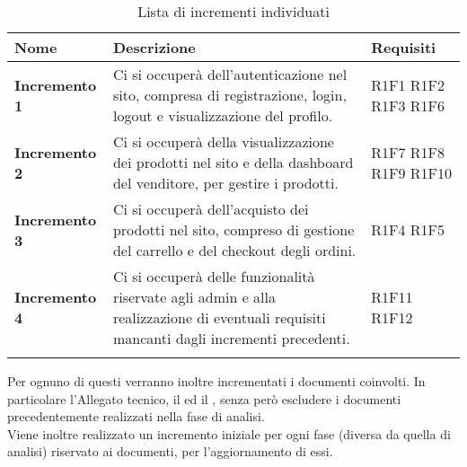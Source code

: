 {


\centering
\renewcommand{\arraystretch}{1.8}
\begin{longtable}{C{3cm} C{8cm} C{3cm} }

\textbf{Nome} &
\textbf{Descrizione}&
\textbf{Requisiti}\\
\endhead

\textbf{Incremento 1} & Ci si occuperà dell'autenticazione nel sito, compresa di registrazione, login, logout e visualizzazione del profilo. & R1F1 \newline R1F2 \newline R1F3 \newline R1F6 \\
\textbf{Incremento 2} & Ci si occuperà della visualizzazione dei prodotti nel sito e della dashboard del venditore, per gestire i prodotti. & R1F7 \newline R1F8 \newline R1F9 \newline R1F10 \\
\textbf{Incremento 3} & Ci si occuperà dell'acquisto dei prodotti nel sito, compreso di gestione del carrello e del checkout degli ordini. & R1F4 \newline R1F5 \\
\textbf{Incremento 4} & Ci si occuperà delle funzionalità riservate agli admin e alla realizzazione di eventuali requisiti mancanti dagli incrementi precedenti. & R1F11 \newline R1F12 \\

\caption{Lista di incrementi individuati}

\end{longtable}
}

Per ognuno di questi verranno inoltre incrementati i documenti coinvolti. In particolare l'Allegato tecnico, il \MU{} ed il \MM{}, senza però escludere i documenti precedentemente realizzati nella fase di analisi.\\
Viene inoltre realizzato un incremento iniziale per ogni fase (diversa da quella di analisi) riservato ai documenti, per l'aggiornamento di essi.
